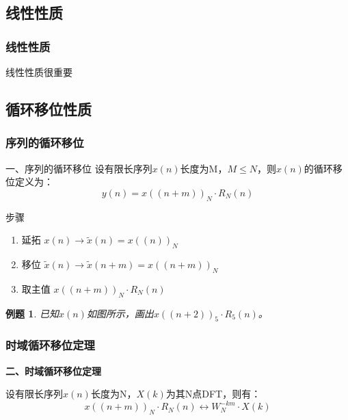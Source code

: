 \documentclass[notheorems,compress,mathserif,table]{beamer}
\newtheorem{example}{例题}
\begin{document}
\subsection{线性性质}

\begin{frame}\frametitle{线性性质}%
线性性质很重要
\end{frame}


\subsection{循环移位性质}
\begin{frame}[shrink]\frametitle{序列的循环移位}%
一、序列的循环移位
\newline
设有限长序列$ x(n) $长度为M，$ M\leq N $，则$ x(n) $的循环移位定义为：
$$y(n) = x((n+m))_N\cdot R_N(n)$$


步骤
\begin{enumerate}
  \item 延拓 \quad \quad\quad \quad     $x(n)\longrightarrow \tilde{x}(n) = x((n))_N$
  \item 移位 \quad \quad \quad \quad    $\tilde{x}(n)\longrightarrow \tilde{x}(n+m) = x((n+m))_N$
  \item 取主值  \quad \quad \quad       $x((n+m))_N\cdot R_N(n)$
\end{enumerate}

\begin{example}
已知$x(n)$如图所示，画出$x((n+2))_5 \cdot R_5(n)$。
\end{example}
\end{frame}
%
%
%
\begin{frame}[shrink]\frametitle{时域循环移位定理}%
\textbf{二、时域循环移位定理}

设有限长序列$x(n)$长度为N，$X(k)$为其N点DFT，则有：
$$x((n+m))_N\cdot R_N(n) \longleftrightarrow W_N^{-km}\cdot X(k)$$

\end{frame}
\end{document}
